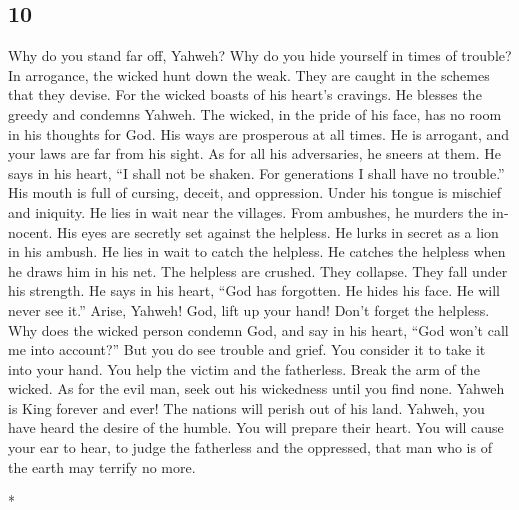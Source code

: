 \begin{paracol}{2}
\switchcolumn
\begin{otherlanguage}{english}

\hypertarget{section-19}{%
\section{10}\label{section-19}}

 Why do you stand far off, Yahweh? Why do you hide
yourself in times of trouble?  In arrogance, the wicked
hunt down the weak. They are caught in the schemes that they devise.
 For the wicked boasts of his heart's cravings. He blesses
the greedy and condemns Yahweh.  The wicked, in the pride
of his face, has no room in his thoughts for God.  His
ways are prosperous at all times. He is arrogant, and your laws are far
from his sight. As for all his adversaries, he sneers at them.
 He says in his heart, ``I shall not be shaken. For
generations I shall have no trouble.''  His mouth is full
of cursing, deceit, and oppression. Under his tongue is mischief and
iniquity.  He lies in wait near the villages. From
ambushes, he murders the innocent. His eyes are secretly set against the
helpless.  He lurks in secret as a lion in his ambush. He
lies in wait to catch the helpless. He catches the helpless when he
draws him in his net.  The helpless are crushed. They
collapse. They fall under his strength.  He says in his
heart, ``God has forgotten. He hides his face. He will never see it.''
 Arise, Yahweh! God, lift up your hand! Don't forget the
helpless.  Why does the wicked person condemn God, and
say in his heart, ``God won't call me into account?'' 
But you do see trouble and grief. You consider it to take it into your
hand. You help the victim and the fatherless.  Break the
arm of the wicked. As for the evil man, seek out his wickedness until
you find none.  Yahweh is King forever and ever! The
nations will perish out of his land.  Yahweh, you have
heard the desire of the humble. You will prepare their heart. You will
cause your ear to hear,  to judge the fatherless and the
oppressed, that man who is of the earth may terrify no more.

\end{otherlanguage}

\switchcolumn[0]*


\end{paracol}

